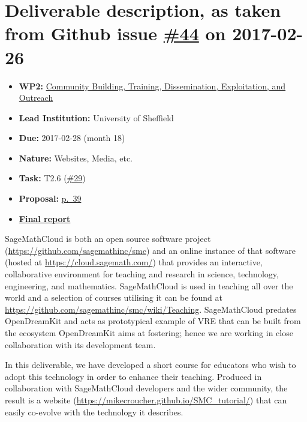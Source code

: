 \section*{\texorpdfstring{Deliverable description, as taken from Github
issue
\href{https://github.com/OpenDreamKit/OpenDreamKit/issues/44}{\#44} on
2017-02-26}{Deliverable description, as taken from Github issue \#44 on 2017-02-26}}\label{deliverable-description-as-taken-from-github-issue-44-on-2017-02-26}

\begin{itemize}
\tightlist
\item
  \textbf{WP2:}
  \href{https://github.com/OpenDreamKit/OpenDreamKit/tree/master/WP2}{Community
  Building, Training, Dissemination, Exploitation, and Outreach}
\item
  \textbf{Lead Institution:} University of Sheffield
\item
  \textbf{Due:} 2017-02-28 (month 18)
\item
  \textbf{Nature:} Websites, Media, etc.
\item
  \textbf{Task:} T2.6
  (\href{https://github.com/OpenDreamKit/OpenDreamKit/issues/29}{\#29})
\item
  \textbf{Proposal:}
  \href{https://github.com/OpenDreamKit/OpenDreamKit/raw/master/Proposal/proposal-www.pdf}{p.~39}
\item
  \textbf{\href{https://github.com/OpenDreamKit/OpenDreamKit/raw/master/WP2/D2.4/report-final.pdf}{Final
  report}}
\end{itemize}

SageMathCloud is both an open source software project
(\url{https://github.com/sagemathinc/smc}) and an online instance of
that software (hosted at \url{https://cloud.sagemath.com/}) that
provides an interactive, collaborative environment for teaching and
research in science, technology, engineering, and mathematics.
SageMathCloud is used in teaching all over the world and a selection of
courses utilising it can be found at
\url{https://github.com/sagemathinc/smc/wiki/Teaching}. SageMathCloud
predates OpenDreamKit and acts as prototypical example of VRE that can
be built from the ecosystem OpenDreamKit aims at fostering; hence we are
working in close collaboration with its development team.

In this deliverable, we have developed a short course for educators who
wish to adopt this technology in order to enhance their teaching.
Produced in collaboration with SageMathCloud developers and the wider
community, the result is a website
(\url{https://mikecroucher.github.io/SMC_tutorial/}) that can easily
co-evolve with the technology it describes.

